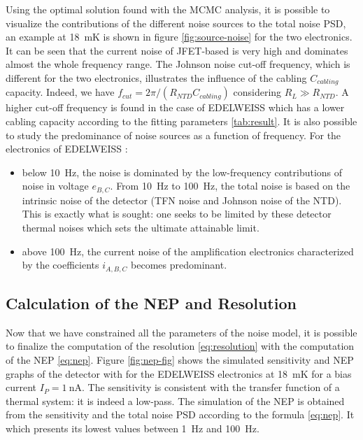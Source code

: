 Using the optimal solution found with the MCMC analysis, it is possible to visualize the contributions of the different noise sources to the total noise PSD, an example at \SI{18}{\milli\kelvin} is shown in figure \ref{fig:source-noise} for the two electronics. It can be seen that the current noise of JFET-based is very high and dominates almost the whole frequency range. The Johnson noise cut-off frequency, which is different for the two electronics, illustrates the influence of the cabling $C_{cabling}$ capacity. Indeed, we have $f_{cut} = 2\pi/(R_{NTD} C_{cabling})$ considering $R_L\gg R_{NTD}$. A higher cut-off frequency is found in the case of EDELWEISS which has a lower cabling capacity according to the fitting parameters \ref{tab:result}. It is also possible to study the predominance of noise sources as a function of frequency. For the electronics of EDELWEISS :
\begin{itemize}
\item below \SI{10}{\Hz}, the noise is dominated by the low-frequency contributions of noise in voltage $e_{B,C}$.
From \SI{10}{\Hz} to \SI{100}{\Hz}, the total noise is based on the intrinsic noise of the detector (TFN noise and Johnson noise of the NTD). This is exactly what is sought: one seeks to be limited by these detector thermal noises which sets the ultimate attainable limit.
\item above \SI{100}{\Hz}, the current noise of the amplification electronics characterized by the coefficients $i_{A,B,C}$ becomes predominant.
\end{itemize} 


\subsection{Calculation of the NEP and Resolution}
\label{par:nep-res}

Now that we have constrained all the parameters of the noise model, it is possible to finalize the computation of the resolution \ref{eq:resolution} with the computation of the NEP \ref{eq:nep}. Figure \ref{fig:nep-fig} shows the simulated sensitivity and NEP graphs of the detector with for the EDELWEISS electronics at \SI{18}{\milli\kelvin} for a bias current $I_P = \SI{1}{\nano\ampere}$. The sensitivity is consistent with the transfer function of a thermal system: it is indeed a low-pass. The simulation of the NEP is obtained from the sensitivity and the total noise PSD according to the formula \ref{eq:nep}. It which presents its lowest values between \SI{1}{\Hz} and \SI{100}{\Hz}. 


